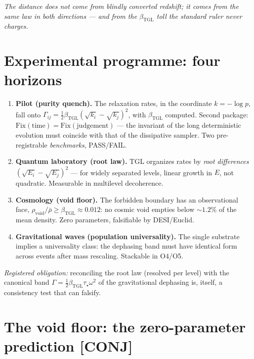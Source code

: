\documentclass[11pt]{article}
\newcommand{\bTGL}{\beta_{\mathrm{TGL}}}\newcommand{\Msun}{M_{\odot}}\newcommand{\TGL}{\mathrm{TGL}}
\theoremstyle{definition}\newtheorem{deriv}{Derivation}
\begin{document}
\emph{The distance does not come from blindly converted redshift; it comes from the same law in both directions --- and from the $\bTGL$ toll the standard ruler never charges.}

\section{Experimental programme: four horizons}\label{sec:horizons}

\begin{enumerate}

\item \textbf{Pilot (purity quench).} The relaxation rates, in the coordinate $k=-\log p$, fall onto $\Gamma_{ij}=\tfrac12\bTGL(\sqrt{k_i}-\sqrt{k_j})^2$, with $\bTGL$ computed. Second package: $\mathrm{Fix}(\text{time})=\mathrm{Fix}(\text{judgement})$ --- the invariant of the long deterministic evolution must coincide with that of the dissipative sampler. Two pre-registrable \emph{benchmarks}, PASS/FAIL.

\item \textbf{Quantum laboratory (root law).} TGL organizes rates by \emph{root differences} $(\sqrt{E_i}-\sqrt{E_j})^2$ --- for widely separated levels, linear growth in $E$, not quadratic. Measurable in multilevel decoherence.

\item \textbf{Cosmology (void floor).} The forbidden boundary has an observational face, $\rho_{\mathrm{void}}/\bar\rho\geq\bTGL\approx0.012$: no cosmic void empties below $\sim1.2\%$ of the mean density. Zero parameters, falsifiable by DESI/Euclid.

\item \textbf{Gravitational waves (population universality).} The single substrate implies a universality class: the dephasing band must have identical form across events after mass rescaling. Stackable in O4/O5.

\end{enumerate}

\emph{Registered obligation:} reconciling the root law (resolved per level) with the canonical band $\Gamma=\tfrac12\bTGL\tau_\star\omega^2$ of the gravitational dephasing is, itself, a consistency test that can falsify.

\section{The void floor: the zero-parameter prediction \textsf{[CONJ]}}
\end{document}
